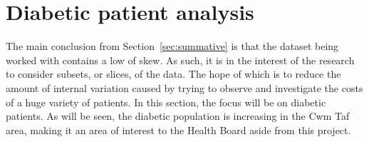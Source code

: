 \section{Diabetic patient analysis}\label{sec:diabetes}

The main conclusion from Section~\ref{sec:summative} is that the dataset being
worked with contains a low of skew. As such, it is in the interest of the
research to consider subsets, or slices, of the data. The hope of which is to
reduce the amount of internal variation caused by trying to observe and
investigate the costs of a huge variety of patients. In this section, the focus
will be on diabetic patients. As will be seen, the diabetic population is
increasing in the Cwm Taf area, making it an area of interest to the Health
Board aside from this project. 
